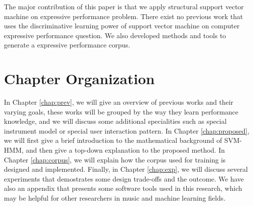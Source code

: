 The major contribution of this paper is that we apply structural support vector machine on expressive performance problem. There exist no previous work that uses the discriminative learning power of support vector machine on computer expressive performance question. We also developed methods and tools to generate a expressive performance corpus.
%
%
\section{Chapter Organization}
In Chapter \ref{chap:prev}, we will give an overview of previous works and their varying goals, these works will be grouped by the way they learn performance knowledge, and we will discuss some additional specialities such as special instrument model or special user interaction pattern. In Chapter \ref{chap:proposed}, we will first give a brief introduction to the mathematical background of SVM-HMM, and then give a top-down explanation to the proposed method. In Chapter \ref{chap:corpus}, we will explain how the corpus used for training is designed and implemented. Finally, in Chapter \ref{chap:exp}, we will discuss several experiments that demostrates some design trade-offs and the outcome. We have also an appendix that presents some software tools used in this research, which may be helpful for other researchers in music and machine learning fields.
